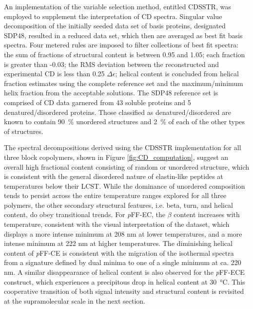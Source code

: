 \begin{refsection}
An implementation of the variable selection method,\cite{Manavalan1987} entitled
CDSSTR, was employed to supplement the interpretation of CD spectra. Singular
value decomposition of the initially seeded data set of basis proteins,
designated SDP48, resulted in a reduced data set, which then are averaged as
best fit basis spectra. Four metered rules are imposed to filter collections of
best fit spectra: the sum of fractions of structural content is between 0.95 and
1.05; each fraction is greater than -0.03; the RMS deviation between the
reconstructed and experimental CD is less than 0.25 ${\Delta\epsilon}$; helical
content is concluded from helical fraction estimates using the complete
reference set and the maximum/minimum helix fraction from the acceptable
solutions. The SDP48 reference set is comprised of CD data garnered from 43
soluble proteins and 5 denatured/disordered proteins. Those classified as
denatured/disordered are known to contain \SI{90}{\percent} unordered structures
and \SI{2}{\percent} of each of the other types of
structures.\cite{Sreerama2000b}

The spectral decompositions derived using the CDSSTR implementation for all
three block copolymers, shown in Figure \ref{fig:CD_computation}, suggest an
overall high fractional content consisting of random or unordered structure,
which is consistent with the general disordered nature of elastin-like peptides
at temperatures below their LCST.  While the dominance of unordered composition
tends to persist across the entire temperature ranges explored for all three
polymers, the other secondary structural features, i.e. beta, turn, and helical
content, do obey transitional trends. For \emph{p}FF-EC, the ${\beta}$ content
increases with temperature, consistent with the visual interpretation of the
dataset, which displays a more intense minimum at 208 nm at lower temperatures,
and a more intense minimum at 222 nm at higher temperatures. The diminishing
helical content of \emph{p}FF-CE is consistent with the migration of the
isothermal spectra from a signature defined by dual minima to one of a single
minimum at ca. 220 nm. A similar disappearance of helical content is also
observed for the \emph{p}FF-ECE construct, which experiences a precipitous drop
in helical content at \SI{30}{\celsius}. This cooperative transition of both
signal intensity and structural content is revisited at the supramolecular scale
in the next section.


\end{refsection}
